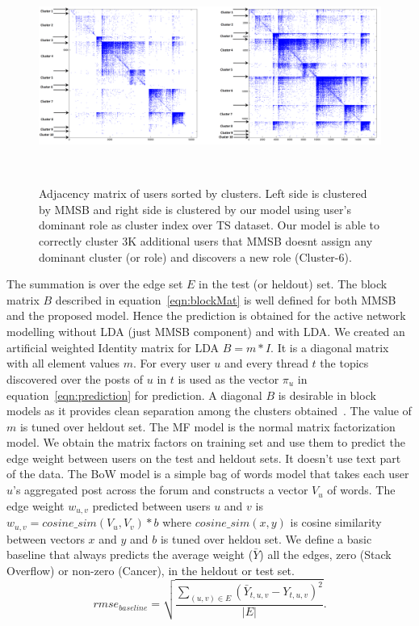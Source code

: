 \documentclass{sig-alternate}
\begin{document}
\begin{center}
\begin{figure}
\includegraphics[height=7cm,width=18cm]{SimilarityMatTSAnnotated.png}
\caption{Adjacency matrix of users sorted by clusters. Left side is 
clustered by MMSB and right side is clustered by our model using user's dominant
role as cluster index over TS dataset. Our model is able to correctly cluster 3K
additional users that MMSB doesnt assign any dominant cluster (or role) and
discovers a new role (Cluster-6).}
\label{fig:similarityMatTS}
\end{figure}
\end{center}
The summation is over the edge set $E$ in the test (or heldout) set. The block matrix
$B$ described in equation~\ref{eqn:blockMat} is well defined for both MMSB and
the proposed model. Hence the prediction is obtained for the active network modelling without
LDA (just MMSB component) and with LDA. We created an artificial
weighted Identity matrix for LDA $\hat{B}=m*I$. It is a diagonal matrix with
all element values $m$. For every user $u$ and every thread $t$ the topics discovered over the
posts of $u$ in $t$ is used as the vector $\pi_u$ in
equation~\ref{eqn:prediction} for prediction. A diagonal $B$ is desirable in
block models as it provides clean separation among the clusters
obtained~\cite{Airoldi:2008:MMS:1390681.1442798}.
The value of $m$ is tuned over heldout set. 
The MF model is the normal matrix factorization model. We obtain the 
matrix factors on training set and use them to predict the edge weight between
users on the test and heldout sets. It doesn't use text part of the data.
The BoW model is a simple bag of words model that takes each user $u$'s
aggregated post across the forum and constructs a vector $V_u$ of words. The 
edge weight $w_{u,v}$ predicted between users $u$ and $v$ is $w_{u,v}=cosine\_sim(V_u,V_v)*b$
where $cosine\_sim(x,y)$ is cosine similarity between vectors $x$ and $y$ and $b$ is tuned
over heldou set. We define a basic baseline that
always predicts the average weight ($\bar{Y}$) all the edges, zero (Stack
Overflow) or non-zero (Cancer), in the heldout or test set.
\vspace*{-0.5\baselineskip}
\small
\begin{equation}
	rmse_{baseline}=\sqrt{\frac{\sum_{(u,v)\in E}(\bar{Y}_{t,u,v}-Y_{t,u,v})^2}{|E|}}.
\end{equation}
\normalsize
\end{document}
